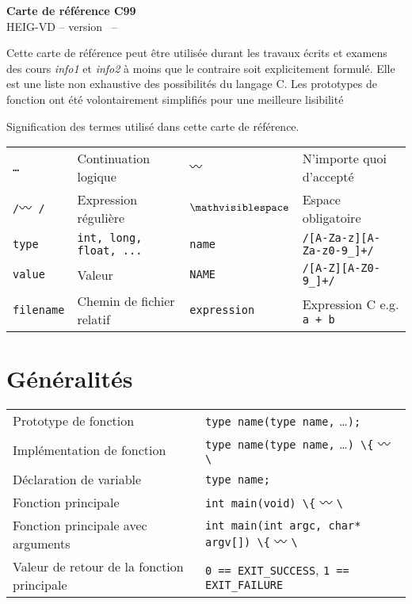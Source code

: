 \documentclass{article}
\newcommand{\etc}{\small \ldots}
\newcommand{\any}{$\hzigzag$ }
\newcommand{\spc}{$\mathvisiblespace$}
\newcommand{\cd}{\lstinline}
\begin{document}
\setlength{\columnseprule}{0.4pt}

\begin{multicols*}{3}
\begin{center}
{\Large \bf Carte de référence C99} \\
HEIG-VD -- version \revision \ -- \revisiondate \\
\end{center}

Cette carte de référence peut être utilisée durant les travaux écrits et examens
des cours \emph{info1} et \emph{info2} à moins que le contraire soit explicitement formulé.
Elle est une liste non exhaustive des possibilités du langage C.
Les prototypes de fonction ont été volontairement simplifiés pour une meilleure lisibilité

Signification des termes utilisé dans cette carte de référence.

\begin{tabularx}{\linewidth}{
  >{\hsize=0.5\hsize}X%
  >{\hsize=1.5\hsize}X%
  >{\hsize=0.5\hsize}X%
  >{\hsize=1.5\hsize}X%
  }

  \tt \etc      & Continuation logique    & \tt \any    & N'importe quoi d'accepté \\
  \tt /\any/    & Expression régulière    & \tt \spc    & Espace obligatoire \\
  \cd{type}     & \tt int, long, float, ... & \cd{name} & \tt /[A-Za-z][A-Za-z0-9\_]+/ \\
  \cd{value}    & Valeur & \cd{NAME} & \tt /[A-Z][A-Z0-9\_]+/ \\
  \cd{filename} & Chemin de fichier relatif & \cd{expression}   & Expression C e.g. \tt a + b \\
\end{tabularx}

\section*{Généralités}
\begin{tabularx}{\linewidth}{lX}
  Prototype de fonction               & \cd{type name(type name,} \etc \cd{);} \\
  Implémentation de fonction         & \cd{type name(type name,} \etc \cd{) \{} \any \cd{\}} \\
  Déclaration de variable            & \cd{type name;} \\
  Fonction principale                & \cd{int main(void) \{} \any \cd{\}} \\
  Fonction principale avec arguments & \cd{int main(int argc, char* argv[]) \{} \any \cd{\}} \\
  Valeur de retour de la fonction principale & \cd{0 == EXIT_SUCCESS}, \cd{1 == EXIT_FAILURE}\\
\end{tabularx}


\end{multicols*}
\end{document}
